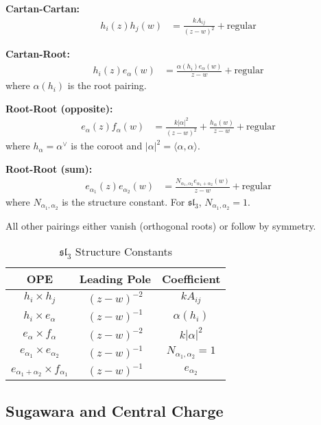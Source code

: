 \begin{theorem}
\label{thm:sl3-opes}
\textbf{Cartan-Cartan:}
\begin{align*}
h_i(z)h_j(w) &= \frac{k A_{ij}}{(z-w)^2} + \text{regular}
\end{align*}

\textbf{Cartan-Root:}
\begin{align*}
h_i(z)e_{\alpha}(w) &= \frac{\alpha(h_i) e_{\alpha}(w)}{z-w} + \text{regular}
\end{align*}
where $\alpha(h_i)$ is the root pairing.

\textbf{Root-Root (opposite):}
\begin{align*}
e_{\alpha}(z)f_{\alpha}(w) &= \frac{k |\alpha|^2}{(z-w)^2} + \frac{h_{\alpha}(w)}{z-w} + \text{regular}
\end{align*}
where $h_{\alpha} = \alpha^\vee$ is the coroot and $|\alpha|^2 = \langle \alpha, \alpha \rangle$.

\textbf{Root-Root (sum):}
\begin{align*}
e_{\alpha_1}(z)e_{\alpha_2}(w) &= \frac{N_{\alpha_1,\alpha_2} e_{\alpha_1+\alpha_2}(w)}{z-w} + \text{regular}
\end{align*}
where $N_{\alpha_1,\alpha_2}$ is the structure constant. For $\mathfrak{sl}_3$, $N_{\alpha_1,\alpha_2} = 1$.

All other pairings either vanish (orthogonal roots) or follow by symmetry.
\end{theorem}

\begin{table}[h]
\centering
\caption{$\mathfrak{sl}_3$ Structure Constants}
\begin{tabular}{|c|c|c|}
\hline
\textbf{OPE} & \textbf{Leading Pole} & \textbf{Coefficient} \\
\hline
$h_i \times h_j$ & $(z-w)^{-2}$ & $k A_{ij}$ \\
$h_i \times e_{\alpha}$ & $(z-w)^{-1}$ & $\alpha(h_i)$ \\
$e_{\alpha} \times f_{\alpha}$ & $(z-w)^{-2}$ & $k |\alpha|^2$ \\
$e_{\alpha_1} \times e_{\alpha_2}$ & $(z-w)^{-1}$ & $N_{\alpha_1,\alpha_2} = 1$ \\
$e_{\alpha_1+\alpha_2} \times f_{\alpha_1}$ & $(z-w)^{-1}$ & $e_{\alpha_2}$ \\
\hline
\end{tabular}
\end{table}

\subsection{Sugawara and Central Charge}

